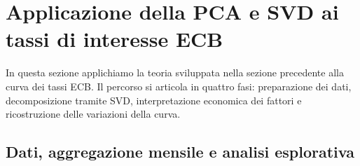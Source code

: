 \documentclass[11pt,a4paper]{article}
\theoremstyle{plain}
\theoremstyle{definition}
\theoremstyle{remark}
\newtheorem*{attenzione}{Nota numerica}
\begin{document}


\section{Applicazione della PCA e SVD ai tassi di interesse ECB}

In questa sezione applichiamo la teoria sviluppata nella sezione precedente alla
curva dei tassi ECB. Il percorso si articola in quattro fasi: preparazione dei
dati, decomposizione tramite SVD, interpretazione economica dei fattori e
ricostruzione delle variazioni della curva.

\subsection{Dati, aggregazione mensile e analisi esplorativa}
\end{document}
